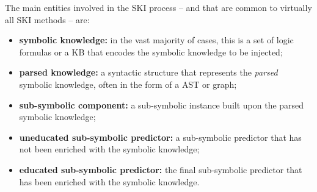 The main entities involved in the \gls{SKI} process -- and that are common to virtually all \gls{SKI} methods -- are:
%
\begin{itemize}
    \item \textbf{symbolic knowledge:} in the vast majority of cases, this is a set of logic formulas or a \gls{KB} that encodes the symbolic knowledge to be injected;
    \item \textbf{parsed knowledge:} a syntactic structure that represents the \emph{parsed} symbolic knowledge, often in the form of a \gls{AST} or graph;
    \item \textbf{sub-symbolic component:} a sub-symbolic instance built upon the parsed symbolic knowledge;
    \item \textbf{uneducated sub-symbolic predictor:} a sub-symbolic predictor that has not been enriched with the symbolic knowledge;
    \item \textbf{educated sub-symbolic predictor:} the final sub-symbolic predictor that has been enriched with the symbolic knowledge.
\end{itemize}
%


